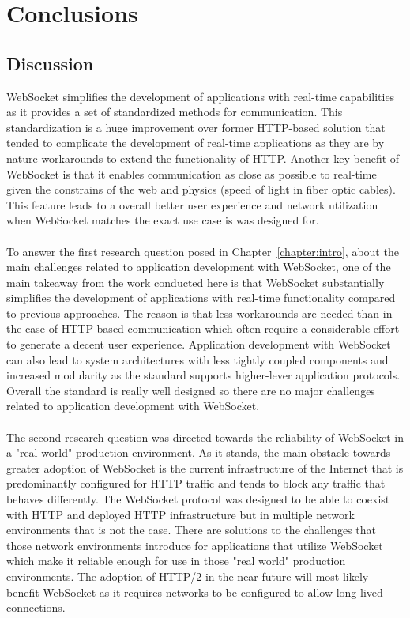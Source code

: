 \chapter{Conclusions}
\label{chapter:conslusions}

\section{Discussion}

WebSocket simplifies the development of applications with real-time capabilities as it provides a set of standardized methods for communication. This standardization is a huge improvement over former HTTP-based solution that tended to complicate the development of real-time applications as they are by nature workarounds to extend the functionality of HTTP. Another key benefit of WebSocket is that it enables communication as close as possible to real-time given the constrains of the web and physics (speed of light in fiber optic cables). This feature leads to a overall better user experience and network utilization when WebSocket matches the exact use case is was designed for.
\\ \\
To answer the first research question posed in Chapter~\ref{chapter:intro}, about the main challenges related to application development with WebSocket, one of the main takeaway from the work conducted here is that WebSocket substantially simplifies the development of applications with real-time functionality compared to previous approaches. The reason is that less workarounds are needed than in the case of HTTP-based communication which often require a considerable effort to generate a decent user experience. Application development with WebSocket can also lead to system architectures with less tightly coupled components and increased modularity as the standard supports higher-lever application protocols. Overall the standard is really well designed so there are no major challenges related to application development with WebSocket.
\\ \\
The second research question was directed towards the reliability of WebSocket in a "real world" production environment. As it stands, the main obstacle towards greater adoption of WebSocket is the current infrastructure of the Internet that is predominantly configured for HTTP traffic and tends to block any traffic that behaves differently. The WebSocket protocol was designed to be able to coexist with HTTP and deployed HTTP infrastructure but in multiple network environments that is not the case. There are solutions to the challenges that those network environments introduce for applications that utilize WebSocket which make it reliable enough for use in those "real world" production environments. The adoption of HTTP/2 in the near future will most likely benefit WebSocket as it requires networks to be configured to allow long-lived connections.
